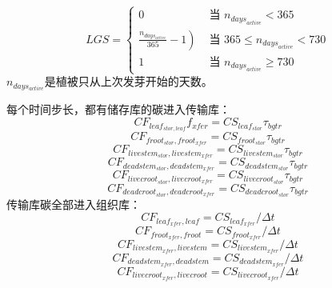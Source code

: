 \begin{equation}
L G S=\left\{\begin{array}{cc}0 &  \text{ 当 } n_{ {days }_{active}}<365 \\ \left.\frac{n_{ {days_{active}}}}{365}-1\right) &  \text{ 当 } 365 \leq n_{ {days }_{active} }<730 \\ 1 & \text{ 当 } n_{ {days}_{active}} \geq 730\end{array}\right.
\end{equation}
$n_{days_{active}}$是植被只从上次发芽开始的天数。


每个时间步长，都有储存库的碳进入传输库：
\begin{equation}
CF_{leaf_{stor,leaf}} f_{xfer}=CS_{leaf_{stor} } \tau_{bgtr}
\end{equation}
\begin{equation}
CF_{ {froot }_{stor},{ froot }_{xfer }}=CS_{{froot }_{stor}} \tau_{bgtr}
\end{equation}
\begin{equation}
  CF_{livestem_{stor},livestem_{xfer}}=CS_{livestem_{stor}}\tau_{bgtr}
\end{equation}
\begin{equation}
  CF_{deadstem_{stor},deadstem_{xfer}}=CS_{deadstem_{stor}}\tau_{bgtr}
\end{equation}
\begin{equation}
  CF_{livecroot_{stor},livecroot_{xfer}}=CS_{livecroot_{stor}}\tau_{bgtr}
\end{equation}
\begin{equation}
  CF_{deadcroot_{stor},deadcroot_{xfer}}=CS_{deadcroot_{stor}}\tau_{bgtr}
\end{equation}
传输库碳全部进入组织库：
\begin{equation}
  CF_{leaf_{xfer},leaf}=CS_{leaf_{xfer}}/\Delta t
\end{equation}
\begin{equation}
  CF_{froot_{xfer},froot}=CS_{froot_{xfer}}/\Delta t
\end{equation}
\begin{equation}
  CF_{livestem_{xfer},livestem}=CS_{livestem_{xfer}}/\Delta t
\end{equation}
\begin{equation}
  CF_{deadstem_{xfer},deadstem}=CS_{deadstem_{xfer}}/\Delta t
\end{equation}
\begin{equation}
  CF_{livecroot_{xfer},livecroot}=CS_{livecroot_{xfer}}/\Delta t
\end{equation}
